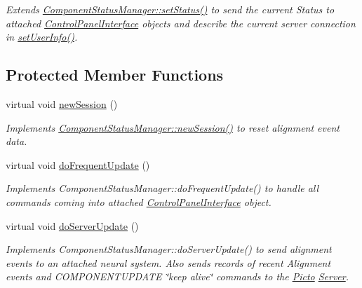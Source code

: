 \begin{DoxyCompactItemize}
\begin{DoxyCompactList}\small\item\em Extends \hyperlink{class_component_status_manager_a6b4219dc5a4105bd24b62d89861ee443}{Component\-Status\-Manager\-::set\-Status()} to send the current Status to attached \hyperlink{class_control_panel_interface}{Control\-Panel\-Interface} objects and describe the current server connection in \hyperlink{class_director_status_manager_a10d0fc15364fa73814c90c9c5300708c}{set\-User\-Info()}. \end{DoxyCompactList}\end{DoxyCompactItemize}
\subsection*{Protected Member Functions}
\begin{DoxyCompactItemize}
\item 
\hypertarget{class_director_status_manager_a5f8b476806aafe1f243165693faa7233}{virtual void \hyperlink{class_director_status_manager_a5f8b476806aafe1f243165693faa7233}{new\-Session} ()}\label{class_director_status_manager_a5f8b476806aafe1f243165693faa7233}

\begin{DoxyCompactList}\small\item\em Implements \hyperlink{class_component_status_manager_a1af23b4bf43eac138ca122be16b37b46}{Component\-Status\-Manager\-::new\-Session()} to reset alignment event data. \end{DoxyCompactList}\item 
\hypertarget{class_director_status_manager_afd629965009196265771f3a7f956a0c8}{virtual void \hyperlink{class_director_status_manager_afd629965009196265771f3a7f956a0c8}{do\-Frequent\-Update} ()}\label{class_director_status_manager_afd629965009196265771f3a7f956a0c8}

\begin{DoxyCompactList}\small\item\em Implements Component\-Status\-Manager\-::do\-Frequent\-Update() to handle all commands coming into attached \hyperlink{class_control_panel_interface}{Control\-Panel\-Interface} object. \end{DoxyCompactList}\item 
\hypertarget{class_director_status_manager_a8149f3706ab34107c3faf01d8dcef3a8}{virtual void \hyperlink{class_director_status_manager_a8149f3706ab34107c3faf01d8dcef3a8}{do\-Server\-Update} ()}\label{class_director_status_manager_a8149f3706ab34107c3faf01d8dcef3a8}

\begin{DoxyCompactList}\small\item\em Implements Component\-Status\-Manager\-::do\-Server\-Update() to send alignment events to an attached neural system. Also sends records of recent Alignment events and C\-O\-M\-P\-O\-N\-E\-N\-T\-U\-P\-D\-A\-T\-E \char`\"{}keep alive\char`\"{} commands to the \hyperlink{namespace_picto}{Picto} \hyperlink{class_server}{Server}. \end{DoxyCompactList}\end{DoxyCompactItemize}
